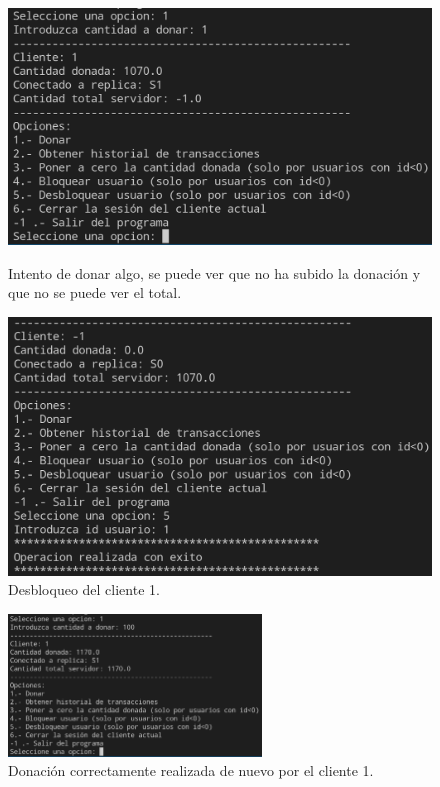 \documentclass{article}
\begin{document}
\begin{figure}[H]
    \centering
    \begin{minipage}[H]{0.49\textwidth}
        \centering
        \includegraphics[width=\textwidth]{imagenes/bloqueo/3.png}
        \caption{Intento de donar algo, se puede ver que no ha subido la donación y que no se puede ver el total.}
    \end{minipage}
    \hfill
    \begin{minipage}[H]{0.49\textwidth}
        \centering
        \includegraphics[width=\textwidth]{imagenes/bloqueo/4.png}
        \caption{Desbloqueo del cliente 1.}
    \end{minipage}
\end{figure}

\begin{figure}[H]
    \centering
    \includegraphics[width=0.6\textwidth]{imagenes/bloqueo/5.png}
    \caption{Donación correctamente realizada de nuevo por el cliente 1.}
\end{figure}
\end{document}

